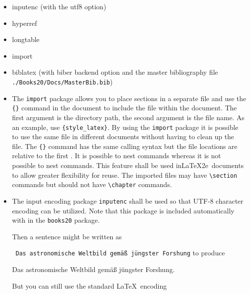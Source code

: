 \begin{itemize}
\item inputenc \cite{Jeffrey2018} (with the utf8 option)
\item hyperref \cite{Rahtz2017}
\item longtable \cite{Carlisle2014}
\item import \cite{Arseneau2009}
\item biblatex \cite{Lehman2018} (with biber backend option and the
  master bibliography file \texttt{./Books20/Docs/MasterBib.bib})
\end{itemize}


\begin{itemize}
\item The \texttt{import} package allows you to place sections in a
  separate file and use the \verb|{}| command in the document
  to include the file within the document. The first argument is the
  directory path, the second argument is the file name. As an example,
  use \verb|{style_latex}|.  By using the \texttt{import}
  package it is possible to use the same file in different documents
  without having to clean up the file. The \verb|{}|
  command has the same calling syntax but the file locations are
  relative to the first \verb||. It is possible to nest
  \verb|| commands whereas it is not possible to nest
  \verb|| commands. This feature shall be used inLaTeX2e\
  documents to allow greater flexibility for reuse. The imported
  files may have \verb|\section| commands but should not have
  \verb|\chapter| commands.

\item {The input encoding package \texttt{inputenc} shall be used
  so that UTF-8 character encoding can be utilized. Note that this
  package is included automatically with in the \texttt{books20} package.

  Then a sentence might be written as
  
  \verb| Das astronomische Weltbild gemäß jüngster Forshung|
  to produce

  Das astronomische Weltbild gemäß jüngster Forshung.

  But you can still use the standard \LaTeX\ encoding
  
}
\end{itemize}
